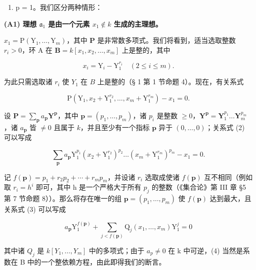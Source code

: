 \begin{enumerate}
\def\labelenumi{(\Alph{enumi})}
\tightlist
\item
  p = 1。我们区分两种情形：
\end{enumerate}

\textbf{(A1) 理想 \(\mathfrak{a}_1\) 是由一个元素 \(x_1 \notin k\) 生成的主理想。}\par

\(x_{1} = \mathrm{P}(\mathrm{Y}_{1},\ldots ,\mathrm{Y}_{m})\)，其中 \(\mathbf{P}\) 是非常数多项式。我们将看到，适当选取整数 \(r_i > 0\)，环 A 在 \(\mathbf{B} = k[x_1,x_2,\dots ,x_m]\) 上是整的，其中

\[
x _ {i} = \mathrm{Y} _ {i} - \mathrm{Y} _ {1} ^ {r _ {i}} \quad (2 \leqslant i \leqslant m).\tag{1}
\]

为此只需选取诸 \(r_i\) 使 \(Y_1\) 在 \(B\) 上是整的（§ 1 第 1 节命题 4）。现在，有关系式

\[
\mathrm{P} \left(\mathrm{Y} _ {1}, x _ {2} + \mathrm{Y} _ {1} ^ {r _ {2}}, \dots , x _ {m} + \mathrm{Y} _ {1} ^ {r _ {m}}\right) - x _ {1} = 0.\tag{2}
\]

设 \(\mathbf{P} = \sum_{\mathbf{p}} a_{\mathbf{p}} \mathbf{Y}^{\mathbf{p}}\)，其中 \(\mathbf{p} = (p_1, \ldots, p_m)\)，诸 \(p_i\) 是整数 \(\geqslant 0\)，\(\mathbf{Y}^{\mathbf{p}} = \mathbf{Y}_1^{p_1} \ldots \mathbf{Y}_m^{p_m}\)，诸 \(a_{\mathbf{p}}\) 皆 \(\neq 0\) 且属于 \(k\)，并且至少有一个指标 \(\mathbf{p}\) 异于 \((0, \ldots, 0)\)；关系式 (2) 可以写成

\[
\sum_ {\mathbf {p}} a _ {\mathbf {p}} \mathrm{Y} _ {1} ^ {p _ {1}} (x _ {2} + \mathrm{Y} _ {1} ^ {r _ {2}}) ^ {p _ {2}} \dots (x _ {m} + \mathrm{Y} _ {1} ^ {r _ {m}}) ^ {p _ {m}} - x _ {1} = 0.\tag{3}
\]

记 \(f(\mathbf{p}) = p_{1} + r_{2}p_{2} + \cdots + r_{m}p_{m}\)，并设诸 \(r_{i}\) 选取成使诸 \(f(\mathbf{p})\) 互不相同（例如取 \(r_{i} = h^{i}\) 即可，其中 h 是一个严格大于所有 \(p_{j}\) 的整数（《集合论》第 III 章 §5 第 7 节命题 8））。那么将存在唯一的组 \(\mathbf{p} = (p_{1}, \ldots, p_{m})\) 使 \(f(\mathbf{p})\) 达到最大，且关系式 (3) 可以写成

\[
a _ {\mathbf {p}} \mathrm{Y} _ {1} ^ {f (\mathbf {p})} + \sum_ {j <   f (\mathbf {p})} \mathrm{Q} _ {j} (x _ {1}, \dots , x _ {m}) \mathrm{Y} _ {1} ^ {j} = 0\tag{4}
\]

其中诸 \(Q_{j}\) 是 \(k[Y_{1},\ldots,Y_{m}]\) 中的多项式；由于 \(a_{p} \neq 0\) 在 k 中可逆，(4) 当然是系数在 B 中的一个整依赖方程，由此即得我们的断言。

